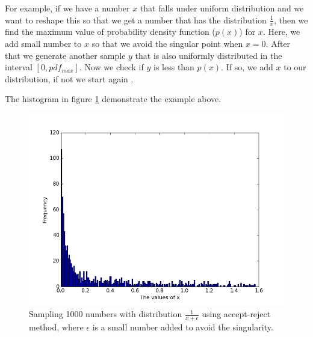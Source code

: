  
For example, if we have a number $x$
that falls under uniform distribution and we want to reshape this so that we get a number  that has the distribution $\frac{1}{x}$, then we find the maximum value of probability density function ($p(x)$) for $x$. Here, we add small number to $x$
so that we avoid the singular point when $x = 0$. After that we generate another sample $y$ that is also uniformly distributed in the interval $[0,pdf_{max}]$. 
Now we check if $y $ is less than $p(x)$. If so, we add $x$ to our distribution,
if not we start again \citep{Weinzierl}. 

The histogram in figure \ref{fig:2} demonstrate the example above.

\begin{figure}[hbtp]
\centering
\includegraphics[scale=.5]{images/inverse_method.png}
\caption{Sampling 1000 numbers with distribution $\frac{1}{x+\epsilon}$ using accept-reject method, where $\epsilon$ is a small number added to avoid the singularity.}\label{fig:2}
\end{figure}


